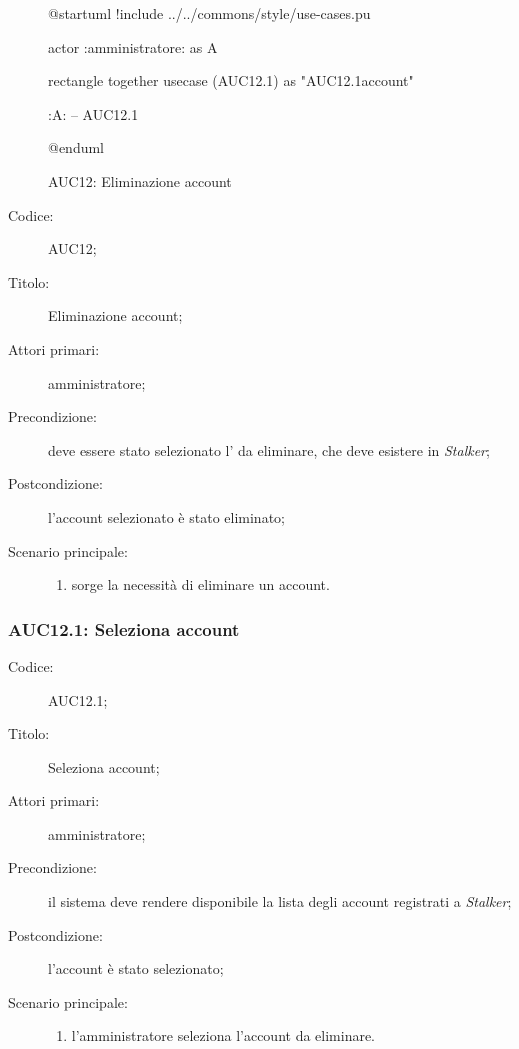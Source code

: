 \documentclass[../../../analisi-dei-requisiti.tex]{subfiles}
\begin{document}
\begin{figure}[H]
  \centering
  \begin{plantuml}
  @startuml
  !include ../../commons/style/use-cases.pu

  actor :amministratore: as A

  rectangle {
    together {
      usecase (AUC12.1) as "AUC12.1\nSeleziona account"
    }
  }

  :A: -- AUC12.1

  @enduml
  \end{plantuml}
  \caption{AUC12: Eliminazione account}%
  \label{fig:auc12}
\end{figure}

\begin{description}
  \item[Codice:] AUC12;
  \item[Titolo:] Eliminazione account;
  \item[Attori primari:] amministratore;
  \item[Precondizione:] deve essere stato selezionato l' da eliminare, che deve esistere in \emph{Stalker};
  \item[Postcondizione:] l'account selezionato è stato eliminato;
  \item[Scenario principale:]
  \begin{enumerate}
    \item sorge la necessità di eliminare un account.
  \end{enumerate}
\end{description}

\subsubsection{AUC12.1: Seleziona account}%
\label{subs:AUC12.1}
\begin{description}
  \item[Codice:] AUC12.1;
  \item[Titolo:] Seleziona account;
  \item[Attori primari:] amministratore;
  \item[Precondizione:] il sistema deve rendere disponibile la lista degli account registrati a \emph{Stalker};
  \item[Postcondizione:] l'account è stato selezionato;
  \item[Scenario principale:]
  \begin{enumerate}
    \item l'amministratore seleziona l'account da eliminare.
  \end{enumerate}
\end{description}
\end{document}
